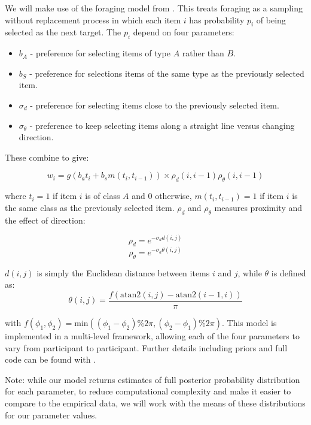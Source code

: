 \documentclass[vision,article,submit,pdftex,moreauthors]{Definitions/mdpi}
\begin{document}
We will make use of the foraging model from \cite{clarke2022foraging}. This treats foraging as a sampling without replacement process in which each item $i$ has probability $p_i$ of being selected as the next target. The $p_i$ depend on four parameters:

\begin{itemize}
    \item $b_A$ - preference for selecting items of type $A$ rather than $B$.
    \item $b_S$ - preference for selections items of the same type as the previously selected item.
    \item $\sigma_d$ - preference for selecting items close to the previously selected item.
    \item $\sigma_{\theta}$ - preference to keep selecting items along a straight line versus changing direction.
\end{itemize}

These combine to give:

\begin{equation}
    w_i = g\left(b_at_i + b_sm(t_i, t_{i-1})\right) \times \rho_d(i, i-1) \rho_{\theta}(i, i-1)
\end{equation}

where $t_i = 1$ if item $i$ is of class $A$ and 0 otherwise, $m(t_i, t_{i-1}) =1$ if item $i$ is the same class as the previously selected item. $\rho_d$ and $\rho_{\theta}$ measures proximity and the effect of direction:

\begin{equation}
    \rho_d = e^{-\sigma_dd(i,j)}
\end{equation}
\begin{equation}
    \rho_{\theta} = e^{-\sigma_d\theta(i,j)}
\end{equation}

$d(i,j)$ is simply the Euclidean distance between items $i$ and $j$, while $\theta$ is defined as:
\begin{equation}
    \theta(i,j) = \frac{f(\text{atan2}(i, j) - \text{atan2}(i-1, i))}{\pi}
\end{equation}

with $f(\phi_1, \phi_2) = \text{min}((\phi_1 - \phi_2) \% 2\pi, (\phi_2 - \phi_1) \% 2\pi)$. This model is implemented in a multi-level framework, allowing each of the four parameters to vary from participant to participant. Further details including priors and full code can be found with \cite{clarke2022foraging}.

Note: while our model returns estimates of full posterior probability distribution for each parameter, to reduce computational complexity and make it easier to compare to the empirical data, we will work with the means of these distributions for our parameter values. 
\end{document}
